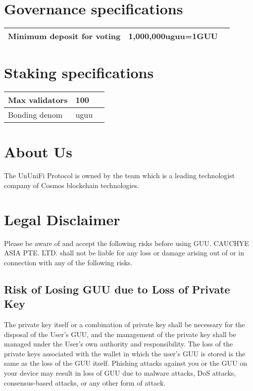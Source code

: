 \documentclass[dvipdfmx]{jsarticle}
\begin{document}
\section{Governance specifications}

\begin{table}[htb]
  \begin{tabular}{|l|l|l|}  \hline
    Minimum deposit for voting & 1,000,000uguu=1GUU \\ \hline
  \end{tabular}
\end{table}

\section{Staking specifications}

\begin{table}[htb]
  \begin{tabular}{|l|l|l|}  \hline
    Max validators & 100 \\ \hline
    Bonding denom & uguu \\ \hline
  \end{tabular}
\end{table}


\section{About Us}
The UnUniFi Protocol is owned by the team which is a leading technologist company of Cosmos blockchain technologies. 

\section{Legal Disclaimer}
Please be aware of and accept the following risks before using GUU. 
CAUCHYE ASIA PTE. LTD. shall not be liable for any loss or damage arising out of or in connection with any of the following risks.

\subsection{Risk of Losing GUU due to Loss of Private Key}
The private key itself or a combination of private key shall be necessary for the disposal of the User's GUU, and the management of the private key shall be managed under the User's own authority and responsibility. 
The loss of the private keys associated with the wallet in which the user's GUU is stored is the same as the loss of the GUU itself. 
Phishing attacks against you or the GUU on your device may result in loss of GUU due to malware attacks, DoS attacks, consensus-based attacks, or any other form of attack.
\end{document}
